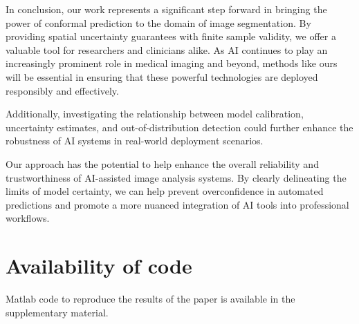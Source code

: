 In conclusion, our work represents a significant step forward in bringing the power of conformal prediction to the domain of image segmentation. By providing spatial uncertainty guarantees with finite sample validity, we offer a valuable tool for researchers and clinicians alike. As AI continues to play an increasingly prominent role in medical imaging and beyond, methods like ours will be essential in ensuring that these powerful technologies are deployed responsibly and effectively.

Additionally, investigating the relationship between model calibration, uncertainty estimates, and out-of-distribution detection could further enhance the robustness of AI systems in real-world deployment scenarios.

Our approach has the potential to help enhance the overall reliability and trustworthiness of AI-assisted image analysis systems. By clearly delineating the limits of model certainty, we can help prevent overconfidence in automated predictions and promote a more nuanced integration of AI tools into professional workflows.

\section*{Availability of code}
\vspace{-0.1cm}
Matlab code to reproduce the results of the paper is available in the supplementary material.